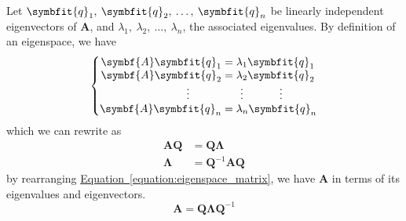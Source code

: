 \documentclass{article}
\begin{document}
\begin{solution}[Proof]
    Let \(\symbfit{q}_1,\: \symbfit{q}_2,\: \dots,\: \symbfit{q}_n\) be
    linearly independent eigenvectors of \(\symbf{A}\), and
    \(\lambda_1,\: \lambda_2,\: \dots,\: \lambda_n\), the associated
    eigenvalues. By definition of an eigenspace, we have
    \begin{equation*}
        \left\{
        \setlength\arraycolsep{0pt}
        \begin{array}{ r >{{}}c<{{}} l }
            \symbf{A}\symbfit{q}_1    & = & \lambda_1 \symbfit{q}_1                            \\
            \symbf{A}\symbfit{q}_2    & = & \lambda_2 \symbfit{q}_2                            \\
            \vdotswithin{\symbfit{q}_3} &   & \vdotswithin{\lambda_3}\vdotswithin{\symbfit{q}_3} \\
            \symbf{A}\symbfit{q}_n    & = & \lambda_n \symbfit{q}_n
        \end{array}
        \right.
    \end{equation*}
    which we can rewrite as
    \begin{align}
        \symbf{A}\symbf{Q} & = \symbf{Q}\symbf{\Lambda} \label{equation:eigenspace_matrix} \\
        \symbf{\Lambda}      & =\symbf{Q}^{-1}\symbf{A}\symbf{Q} \nonumber
    \end{align}
    by rearranging
    \hyperref[equation:eigenspace_matrix]{Equation~\ref{equation:eigenspace_matrix}},
    we have \(\symbf{A}\) in terms of its eigenvalues and
    eigenvectors.
    \begin{equation*}
        \symbf{A} = \symbf{Q}\symbf{\Lambda} \symbf{Q}^{-1}
    \end{equation*}
\end{solution}
\end{document}
